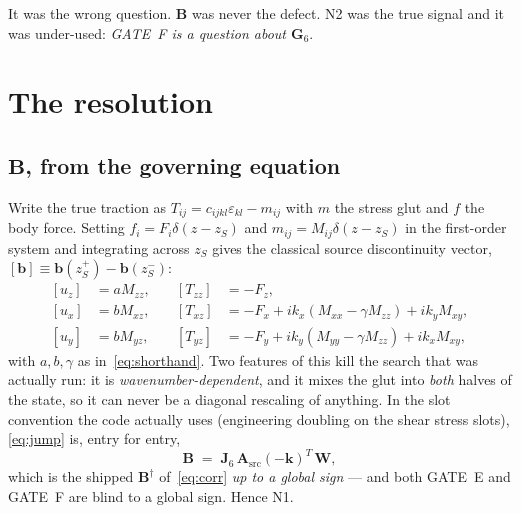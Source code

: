 \documentclass[11pt,a4paper]{article}
\newcommand{\bJ}{\mathbf{J}}
\newcommand{\bW}{\mathbf{W}}
\newcommand{\bA}{\mathbf{A}}
\newcommand{\bB}{\mathbf{B}}
\newcommand{\bG}{\mathbf{G}}
\begin{document}
It was the wrong question.  $\bB$ was never the defect.  N2 was the true
signal and it was under-used: \emph{GATE~F is a question about $\bG_6$}.

\section{The resolution}\label{sec:resolution}

\subsection{$\bB$, from the governing equation}

Write the true traction as $T_{ij} = c_{ijkl}\varepsilon_{kl} - m_{ij}$ with
$m$ the stress glut and $f$ the body force.  Setting
$f_i = F_i\delta(z-z_S)$ and $m_{ij} = M_{ij}\delta(z-z_S)$ in the first-order
system and integrating across $z_S$ gives the classical source discontinuity
vector, $[\mathbf{b}] \equiv \mathbf{b}(z_S^+)-\mathbf{b}(z_S^-)$:
\begin{equation}\label{eq:jump}
\begin{aligned}
  {[u_z]} &= a M_{zz}, &\quad [T_{zz}] &= -F_z,\\
  {[u_x]} &= b M_{xz}, &\quad [T_{xz}] &= -F_x + ik_x(M_{xx}-\gamma M_{zz}) + ik_y M_{xy},\\
  {[u_y]} &= b M_{yz}, &\quad [T_{yz}] &= -F_y + ik_y(M_{yy}-\gamma M_{zz}) + ik_x M_{xy},
\end{aligned}
\end{equation}
with $a,b,\gamma$ as in~\eqref{eq:shorthand}.  Two features of this kill the
search that was actually run: it is \emph{wavenumber-dependent}, and it mixes
the glut into \emph{both} halves of the state, so it can never be a diagonal
rescaling of anything.  In the slot convention the code actually uses
(engineering doubling on the shear stress slots), \eqref{eq:jump} is, entry for
entry,
\begin{equation}\label{eq:Bclosed}
  \bB \;=\; \bJ_6\,\bA_{\text{src}}(-\mathbf{k})^{T}\,\bW,
\end{equation}
which is the shipped $\bB^{\dagger}$ of~\eqref{eq:corr} \emph{up to a global
sign} --- and both GATE~E and GATE~F are blind to a global sign.  Hence N1.
\end{document}
